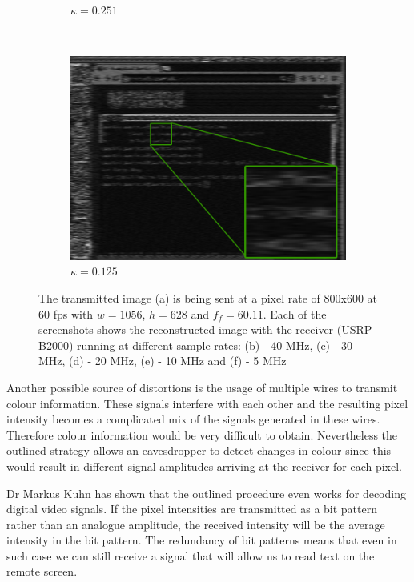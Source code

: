 \documentclass[a4paper,12pt,twoside,openright]{report}
\begin{document}
\begin{figure}[p!]
\begin{subfigure}[b]{0.45\textwidth}
  \caption{$\kappa = 0.251$}
\end{subfigure} ~
\begin{subfigure}[b]{0.45\textwidth}
  \includegraphics[width=\textwidth]{sr_5MHz_at_190MHz}
  \caption{$\kappa = 0.125$}
\end{subfigure}
\caption{The transmitted image (a) is being sent at a pixel rate of 800x600 at 60 fps with $w = 1056$, $h = 628$ and $f_{f} = 60.11$. Each of the screenshots shows the reconstructed image with the receiver (USRP B2000) running at different sample rates: (b) - 40 MHz, (c) - 30 MHz, (d) - 20 MHz, (e) - 10 MHz and (f) - 5 MHz}
\label{fig:samplerates}
\end{figure}

Another possible source of distortions is the usage of multiple wires to transmit colour information. These signals interfere with each other and the resulting pixel intensity becomes a complicated mix of the signals generated in these wires. Therefore colour information would be very difficult to obtain. Nevertheless the outlined strategy allows an eavesdropper to detect changes in colour since this would result in different signal amplitudes arriving at the receiver for each pixel.

Dr Markus Kuhn has shown that the outlined procedure even works for decoding digital video signals\cite{kuhn2005electromagnetic}. If the pixel intensities are transmitted as a bit pattern rather than an analogue amplitude, the received intensity will be the average intensity in the bit pattern. The redundancy of bit patterns means that even in such case we can still receive a signal that will allow us to read text on the remote screen. 
\end{document}
